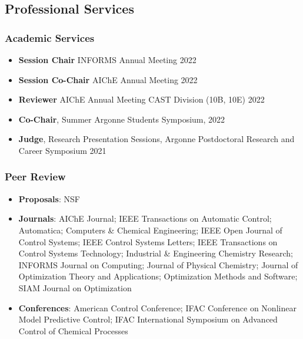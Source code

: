 \documentclass[letterpaper, 11pt]{article}
\begin{document}
\subsection*{Professional Services}
\subsubsection*{Academic Services}
\begin{itemize}[leftmargin=*,itemsep=-1pt]
\item[] {\bf Session Chair} INFORMS Annual Meeting \hfill 2022
\item[] {\bf Session Co-Chair} AIChE Annual Meeting \hfill 2022
\item[] {\bf Reviewer} AIChE Annual Meeting CAST Division (10B, 10E) \hfill 2022
\item[] {\bf Co-Chair}, Summer Argonne Students Symposium, \hfill 2022
\item[] {\bf Judge}, Research Presentation Sessions, Argonne Postdoctoral Research and Career Symposium \hfill 2021
\end{itemize}

\subsubsection*{Peer Review}
\begin{itemize}[leftmargin=*]
\item[] {\bf Proposals}: NSF 
\item[] {\bf Journals}: AIChE Journal; IEEE Transactions on Automatic Control; Automatica; Computers \& Chemical Engineering; IEEE Open Journal of Control Systems; IEEE Control Systems Letters; IEEE Transactions on Control Systems Technology; Industrial \& Engineering Chemistry Research; INFORMS Journal on Computing; Journal of Physical Chemistry; Journal of Optimization Theory and Applications; Optimization Methods and Software; SIAM Journal on Optimization
\item[] {\bf Conferences}: American Control Conference; IFAC Conference on Nonlinear Model Predictive Control; IFAC International Symposium on Advanced Control of Chemical Processes 
\end{itemize}  
\end{document}
